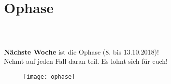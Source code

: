 \section{Ophase}
\begin{frame}
	\frametitle{\insertsectionhead \\ {\small \insertsubsectionhead}}
	\textbf{Nächste Woche} ist die Ophase (8. bis 13.10.2018)! \\
	Nehmt auf jeden Fall daran teil. Es lohnt sich für euch!
	\begin{figure}
		\centering
		\texttt{[image: ophase]}
	\end{figure}
\end{frame}


